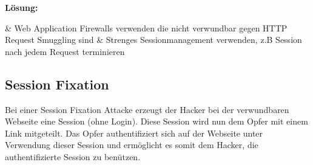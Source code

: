 \textbf{Lösung:}
\begin{easylist}
	& Web Application Firewalls verwenden die nicht verwundbar gegen HTTP Request Smuggling sind
	& Strenges Sessionmanagement verwenden, z.B Session nach jedem Request terminieren 
\end{easylist} 

\subsection{Session Fixation}
Bei einer Session Fixation Attacke erzeugt der Hacker bei der verwundbaren Webseite eine Session (ohne Login). Diese Session wird nun dem Opfer mit einem Link mitgeteilt. Das Opfer authentifiziert sich auf der Webseite unter Verwendung dieser Session und ermöglicht es somit dem Hacker, die authentifizierte Session zu benützen.

